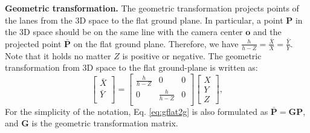 \documentclass[letterpaper]{article} \usepackage{aaai22}  \usepackage{times}  \usepackage{helvet}  \usepackage{courier}  \usepackage[hyphens]{url}  \usepackage{graphicx} \urlstyle{rm} \def\UrlFont{\rm}  \usepackage{natbib}  \usepackage{caption}
\begin{document}
\noindent \textbf{Geometric transformation.}
The geometric transformation projects points of the lanes from the 3D space to the flat ground plane. In particular, a point $\mathbf{P}$ in the 3D space should be on the same line with the camera center $\mathbf{o}$ and the projected point $\bar{\mathbf{P}}$ on the flat ground plane. Therefore, we have $\frac{h}{h-Z}=\frac{\bar{X}}{X}=\frac{\bar{Y}}{Y}$. Note that it holds no matter $Z$ is positive or negative. The geometric transformation from 3D space to the flat ground-plane is written as:
\begin{equation}
\label{eq:gflat2g}
\begin{bmatrix}
   \bar{X} \\
   \bar{Y} \\
\end{bmatrix}
=
\begin{bmatrix}
   \frac{h}{h-Z} &0 &0 \\
   0 &\frac{h}{h-Z} &0 \\
\end{bmatrix}
\begin{bmatrix}
   X \\
   Y \\
   Z
\end{bmatrix},
\end{equation}
For the simplicity of the notation, Eq. \ref{eq:gflat2g} is also formulated as
$\bar{\mathbf{P}}=\mathbf{G}\mathbf{P}$, and $\mathbf{G}$ is the geometric transformation matrix. 
\end{document}
